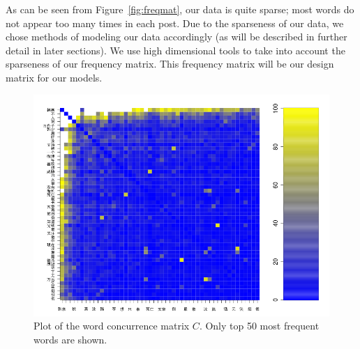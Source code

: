 \documentclass[11pt]{article}
\newcommand{\note}[1]{{\em \color{red} #1}}
\newcommand{\1}[1]{{\mathbf 1}\left\{#1\right\}}        %
\begin{document}

As can be seen from Figure~\ref{fig:freqmat}, our data is quite sparse; most words do not appear too many times in each post. 
Due to the sparseness of our data, we chose methods of modeling our data accordingly (as will be described
in further detail in later sections). We use high dimensional tools to take into account the sparseness of our 
frequency matrix.  This frequency matrix will be our design matrix for our models.  




\begin{center}
\begin{figure}[tb]
   \centering
   \includegraphics[width=\textwidth]{../coocurResults/cooccurMatPlot.png} 
      \caption{Plot of the word concurrence matrix $C$. Only top 50 most frequent words are shown.}
   \label{fig:coocurmat}
\end{figure}
\end{center}
\end{document}
